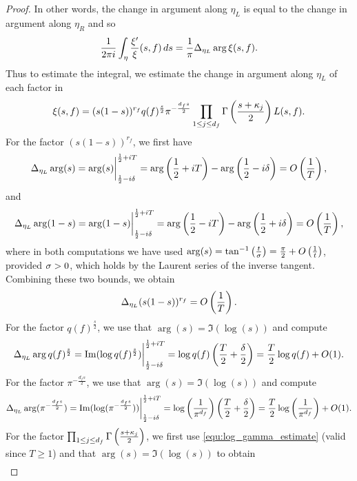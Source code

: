 \begin{proof}
      In other words, the change in argument along $\eta_{L}$ is equal to the change in argument along $\eta_{R}$ and so
      \[
        \frac{1}{2\pi i}\int_{\eta}\frac{\xi'}{\xi}(s,f)\,ds = \frac{1}{\pi}\Delta_{\eta_{L}}\arg\xi(s,f).
      \]
      Thus to estimate the integral, we estimate the change in argument along $\eta_{L}$ of each factor in
      \[
        \xi(s,f) = (s(1-s))^{r_{f}}q(f)^{\frac{s}{2}}\pi^{-\frac{d_{f}s}{2}}\prod_{1 \le j \le d_{f}}\Gamma\left(\frac{s+\kappa_{j}}{2}\right)L(s,f).
      \]
      For the factor $(s(1-s))^{r_{f}}$, we first have
      \[
        \Delta_{\eta_{L}}\arg(s) = \arg(s)\bigg|_{\frac{1}{2}-i\delta}^{\frac{1}{2}+iT} = \arg\left(\frac{1}{2}+iT\right)-\arg\left(\frac{1}{2}-i\delta\right) = O\left(\frac{1}{T}\right),
      \]
      and
      \[
        \Delta_{\eta_{L}}\arg(1-s) = \arg(1-s)\bigg|_{\frac{1}{2}-i\delta}^{\frac{1}{2}+iT} = \arg\left(\frac{1}{2}-iT\right)-\arg\left(\frac{1}{2}+i\delta\right) = O\left(\frac{1}{T}\right),
      \]
      where in both computations we have used $\arg(s) = \tan^{-1}\left(\frac{t}{\sigma}\right) = \frac{\pi}{2}+O\left(\frac{1}{t}\right)$, provided $\sigma > 0$, which holds by the Laurent series of the inverse tangent. Combining these two bounds, we obtain
      \begin{equation}\label{equ:zero_counting_1}
        \Delta_{\eta_{L}}(s(1-s))^{r_{f}} = O\left(\frac{1}{T}\right).
      \end{equation}
      For the factor $q(f)^{\frac{s}{2}}$, we use that $\arg(s) = \Im(\log(s))$ and compute
      \begin{equation}\label{equ:zero_counting_2}
        \Delta_{\eta_{L}}\arg{q(f)^{\frac{s}{2}}} = \mathrm{Im}(\log{q(f)^{\frac{s}{2}}})\bigg|_{\frac{1}{2}-i\delta}^{\frac{1}{2}+iT} = \log{q(f)}\left(\frac{T}{2}+\frac{\delta}{2}\right) = \frac{T}{2}\log{q(f)}+O(1).
      \end{equation}
      For the factor $\pi^{-\frac{d_{f}s}{2}}$, we use that $\arg(s) = \Im(\log(s))$ and compute
      \begin{equation}\label{equ:zero_counting_3}
        \Delta_{\eta_{L}}\arg(\pi^{-\frac{d_{f}s}{2}}) = \mathrm{Im}(\log(\pi^{-\frac{d_{f}s}{2}}))\bigg|_{\frac{1}{2}-i\delta}^{\frac{1}{2}+iT} = \log\left(\frac{1}{\pi^{d_{f}}}\right)\left(\frac{T}{2}+\frac{\delta}{2}\right) = \frac{T}{2}\log\left(\frac{1}{\pi^{d_{f}}}\right)+O(1).
      \end{equation}
      For the factor $\prod_{1 \le j \le d_{f}}\Gamma\left(\frac{s+\kappa_{j}}{2}\right)$, we first use \cref{equ:log_gamma_estimate} (valid since $T \ge 1$) and that $\arg(s) = \Im(\log(s))$ to obtain
      \begin{align*}

\end{align*}
\end{proof}
